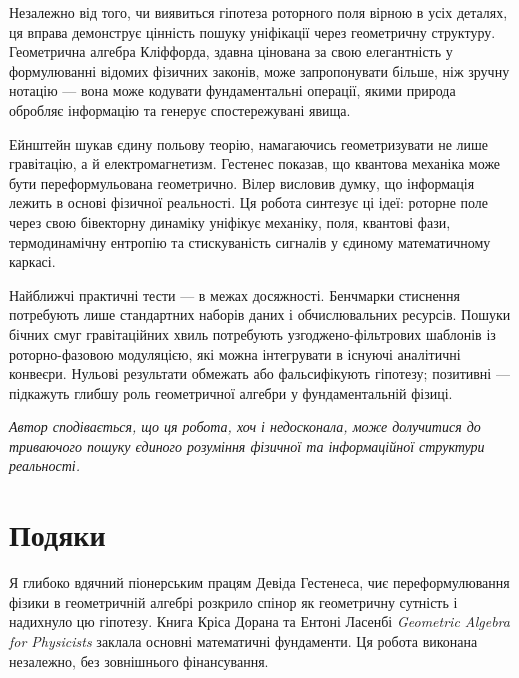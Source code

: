 \documentclass[11pt,a4paper]{article}
\theoremstyle{definition}
\theoremstyle{plain}
\theoremstyle{remark}
\begin{document}
Незалежно від того, чи виявиться гіпотеза роторного поля вірною в усіх деталях, ця вправа демонструє цінність пошуку уніфікації через геометричну структуру. Геометрична алгебра Кліффорда, здавна цінована за свою елегантність у формулюванні відомих фізичних законів, може запропонувати більше, ніж зручну нотацію — вона може кодувати фундаментальні операції, якими природа обробляє інформацію та генерує спостережувані явища.

Ейнштейн шукав єдину польову теорію, намагаючись геометризувати не лише гравітацію, а й електромагнетизм. Гестенес показав, що квантова механіка може бути переформульована геометрично. Вілер висловив думку, що інформація лежить в основі фізичної реальності. Ця робота синтезує ці ідеї: роторне поле через свою бівекторну динаміку уніфікує механіку, поля, квантові фази, термодинамічну ентропію та стискуваність сигналів у єдиному математичному каркасі.

Найближчі практичні тести — в межах досяжності. Бенчмарки стиснення потребують лише стандартних наборів даних і обчислювальних ресурсів. Пошуки бічних смуг гравітаційних хвиль потребують узгоджено-фільтрових шаблонів із роторно-фазовою модуляцією, які можна інтегрувати в існуючі аналітичні конвеєри. Нульові результати обмежать або фальсифікують гіпотезу; позитивні — підкажуть глибшу роль геометричної алгебри у фундаментальній фізиці.

\medskip
\noindent\textit{Автор сподівається, що ця робота, хоч і недосконала, може долучитися до триваючого пошуку єдиного розуміння фізичної та інформаційної структури реальності.}

\vspace{1em}

\section*{Подяки}

Я глибоко вдячний піонерським працям Девіда Гестенеса, чиє переформулювання фізики в геометричній алгебрі розкрило спінор як геометричну сутність і надихнуло цю гіпотезу. Книга Кріса Дорана та Ентоні Ласенбі \textit{Geometric Algebra for Physicists} заклала основні математичні фундаменти. Ця робота виконана незалежно, без зовнішнього фінансування.

\vspace{1em}
\end{document}
